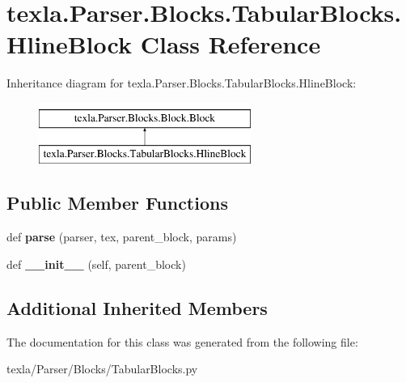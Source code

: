 \hypertarget{classtexla_1_1Parser_1_1Blocks_1_1TabularBlocks_1_1HlineBlock}{}\section{texla.\+Parser.\+Blocks.\+Tabular\+Blocks.\+Hline\+Block Class Reference}
\label{classtexla_1_1Parser_1_1Blocks_1_1TabularBlocks_1_1HlineBlock}
Inheritance diagram for texla.\+Parser.\+Blocks.\+Tabular\+Blocks.\+Hline\+Block\+:\begin{figure}[H]
\begin{center}
\leavevmode
\includegraphics[height=2.000000cm]{classtexla_1_1Parser_1_1Blocks_1_1TabularBlocks_1_1HlineBlock}
\end{center}
\end{figure}
\subsection*{Public Member Functions}
\begin{DoxyCompactItemize}
\item 
\hypertarget{classtexla_1_1Parser_1_1Blocks_1_1TabularBlocks_1_1HlineBlock_a9d8482d681c49219ff2b99318d0723ae}{}\label{classtexla_1_1Parser_1_1Blocks_1_1TabularBlocks_1_1HlineBlock_a9d8482d681c49219ff2b99318d0723ae} 
def {\bfseries parse} (parser, tex, parent\+\_\+block, params)
\item 
\hypertarget{classtexla_1_1Parser_1_1Blocks_1_1TabularBlocks_1_1HlineBlock_a40f4c1e692bc7acfe8b33ace58749c62}{}\label{classtexla_1_1Parser_1_1Blocks_1_1TabularBlocks_1_1HlineBlock_a40f4c1e692bc7acfe8b33ace58749c62} 
def {\bfseries \+\_\+\+\_\+init\+\_\+\+\_\+} (self, parent\+\_\+block)
\end{DoxyCompactItemize}
\subsection*{Additional Inherited Members}


The documentation for this class was generated from the following file\+:\begin{DoxyCompactItemize}
\item 
texla/\+Parser/\+Blocks/Tabular\+Blocks.\+py\end{DoxyCompactItemize}
